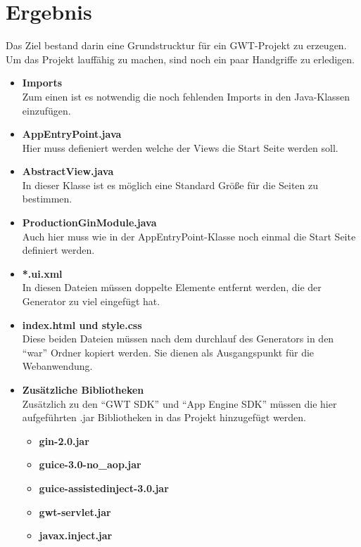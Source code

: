 \chapter{Ergebnis} \label{Ergebnis}

Das Ziel bestand darin eine Grundstrucktur für ein GWT-Projekt zu erzeugen. 
Um das Projekt lauffähig zu machen, sind noch ein paar Handgriffe zu erledigen.
\begin{itemize}
  \item \textbf{Imports} \\
  Zum einen ist es notwendig die noch fehlenden Imports in den Java-Klassen
  einzufügen. 
  \item \textbf{AppEntryPoint.java} \\
  Hier muss defieniert werden welche der Views die Start Seite werden soll.
  \item \textbf{AbstractView.java} \\
  In dieser Klasse ist es möglich eine Standard Größe für die Seiten zu
  bestimmen.
  \item \textbf{ProductionGinModule.java} \\
  Auch hier muss wie in der AppEntryPoint-Klasse noch einmal die Start Seite
  definiert werden.
  \item \textbf{*.ui.xml} \\
  In diesen Dateien müssen doppelte Elemente entfernt werden, die der Generator zu
  viel eingefügt hat.
  \item \textbf{index.html und style.css} \\
  Diese beiden Dateien müssen nach dem durchlauf des Generators in den "`war"'
  Ordner kopiert werden. Sie dienen als Ausgangspunkt für die Webanwendung.
  \item \textbf{Zusätzliche Bibliotheken}\\
  	Zusätzlich zu den "`GWT SDK"' und "`App Engine SDK"' müssen die
    hier aufgeführten .jar Bibliotheken in das Projekt hinzugefügt werden.
  	\begin{itemize}
  	  \item \textbf{gin-2.0.jar}
  	  \item \textbf{guice-3.0-no\_aop.jar}
  	  \item \textbf{guice-assistedinject-3.0.jar}
  	  \item \textbf{gwt-servlet.jar}
  	  \item \textbf{javax.inject.jar}
	\end{itemize}
	
\end{itemize}

